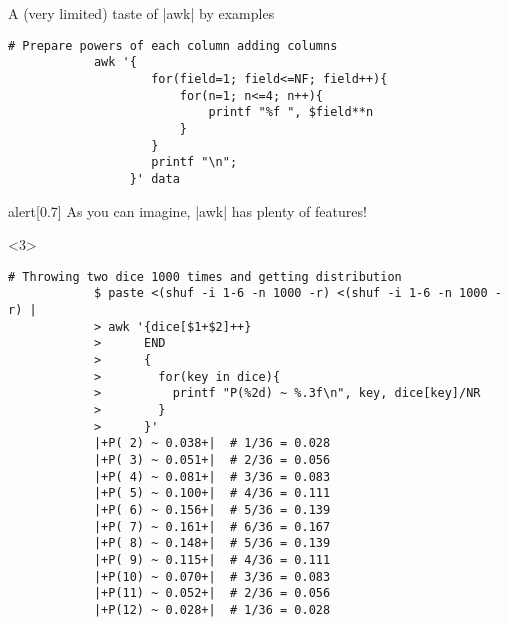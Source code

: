 \begin{frame}[fragile]{A (very limited) taste of \bash|awk| by examples}
\begin{onlyenv}
\begin{lstlisting}[style=MyBash, numbers=none, xleftmargin=3mm, xrightmargin=3mm, belowskip=-3mm]
            # Prepare powers of each column adding columns
            awk '{
                    for(field=1; field<=NF; field++){
                        for(n=1; n<=4; n++){
                            printf "%f ", $field**n
                        }
                    }
                    printf "\n";
                 }' data
        \end{lstlisting}
        \begin{varblock}{alert}[0.7\textwidth]{}
            \Large \alert{As you can imagine, \bash|awk| has plenty of features!}
        \end{varblock}
    \end{onlyenv}
    \begin{onlyenv}<3>
        \begin{lstlisting}[style=MyBash, numbers=none, xleftmargin=3mm, xrightmargin=3mm]
            # Throwing two dice 1000 times and getting distribution
            $ paste <(shuf -i 1-6 -n 1000 -r) <(shuf -i 1-6 -n 1000 -r) |
            > awk '{dice[$1+$2]++}
            >      END
            >      {
            >        for(key in dice){
            >          printf "P(%2d) ~ %.3f\n", key, dice[key]/NR
            >        }
            >      }'
            |+P( 2) ~ 0.038+|  # 1/36 = 0.028
            |+P( 3) ~ 0.051+|  # 2/36 = 0.056
            |+P( 4) ~ 0.081+|  # 3/36 = 0.083
            |+P( 5) ~ 0.100+|  # 4/36 = 0.111
            |+P( 6) ~ 0.156+|  # 5/36 = 0.139
            |+P( 7) ~ 0.161+|  # 6/36 = 0.167
            |+P( 8) ~ 0.148+|  # 5/36 = 0.139
            |+P( 9) ~ 0.115+|  # 4/36 = 0.111
            |+P(10) ~ 0.070+|  # 3/36 = 0.083
            |+P(11) ~ 0.052+|  # 2/36 = 0.056
            |+P(12) ~ 0.028+|  # 1/36 = 0.028
        \end{lstlisting}
    \end{onlyenv}
\end{frame}

